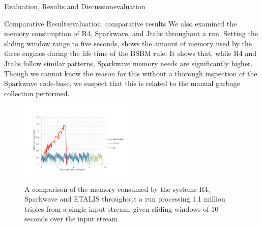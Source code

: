 \begin{nestedsection}{Evaluation, Results and Discussion}{evaluation}
\begin{nestedsection}{Comparative Results}{evaluation: comparative results}
		We also examined the memory consumption of R4, Sparkwave, and Jtalis throughout a run.
		Setting the sliding window range to five seconds,  shows the amount of memory used by the three engines during the life time of the BSBM rule.
		It shows that, while R4 and Jtalis follow similar patterns, Sparkwave memory needs are significantly higher.
		Though we cannot know the reason for this without a thorough inspection of the Sparkwave code-base, we suspect that this is related to the manual garbage collection performed.
		\begin{figure}
			\centering
			\includegraphics[width=0.5\textwidth]{memoryConsumptionComparison}
			\caption{A comparison of the memory consumed by the systems R4, Sparkwave and ETALIS throughout a run processing 1.1 million triples from a single input stream, given sliding windows of 10 seconds over the input stream.}
		\end{figure}
	\end{nestedsection}

\end{nestedsection}
